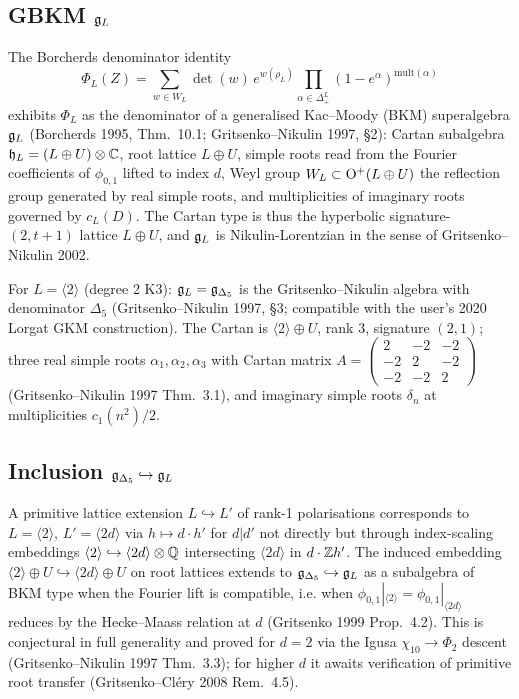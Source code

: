 \subsection*{GBKM $\mathfrak{g}_L$}

The Borcherds denominator identity
\[
 \Phi_L(Z) = \sum_{w \in W_L} \det(w)\, e^{w(\rho_L)} \prod_{\alpha \in \Delta_+^L} (1 - e^{\alpha})^{\mathrm{mult}(\alpha)}
\]
exhibits $\Phi_L$ as the denominator of a generalised Kac--Moody (BKM)
superalgebra $\mathfrak{g}_L$ (Borcherds 1995, Thm.~10.1; Gritsenko--Nikulin 1997,
\S2): Cartan subalgebra $\mathfrak{h}_L = (L \oplus U) \otimes \mathbb{C}$, root lattice
$L \oplus U$, simple roots read from the Fourier coefficients of
$\phi_{0,1}$ lifted to index $d$, Weyl group $W_L \subset \mathrm{O}^+(L \oplus U)$ the
reflection group generated by real simple roots, and multiplicities of
imaginary roots governed by $c_L(D)$. The Cartan type is thus the hyperbolic
signature-$(2, t+1)$ lattice $L \oplus U$, and $\mathfrak{g}_L$ is Nikulin-Lorentzian
in the sense of Gritsenko--Nikulin 2002.

For $L = \langle 2 \rangle$ (degree 2 K3): $\mathfrak{g}_L = \mathfrak{g}_{\Delta_5}$ is
the Gritsenko--Nikulin algebra with denominator $\Delta_5$ (Gritsenko--Nikulin
1997, \S3; compatible with the user's 2020 Lorgat GKM construction).
The Cartan is $\langle 2 \rangle \oplus U$, rank $3$, signature $(2, 1)$;
three real simple roots $\alpha_1, \alpha_2, \alpha_3$ with Cartan matrix
$A = \begin{pmatrix} 2 & -2 & -2 \\ -2 & 2 & -2 \\ -2 & -2 & 2 \end{pmatrix}$
(Gritsenko--Nikulin 1997 Thm.~3.1), and imaginary simple roots $\delta_n$
at multiplicities $c_1(n^2) / 2$.

\subsection*{Inclusion $\mathfrak{g}_{\Delta_5} \hookrightarrow \mathfrak{g}_L$}

A primitive lattice extension $L \hookrightarrow L'$ of rank-1 polarisations
corresponds to $L = \langle 2 \rangle$, $L' = \langle 2d \rangle$ via
$h \mapsto d \cdot h'$ for $d | d'$ not directly but through index-scaling
embeddings $\langle 2 \rangle \hookrightarrow \langle 2d \rangle \otimes \mathbb{Q}$
intersecting $\langle 2d \rangle$ in $d \cdot \mathbb{Z} h'$. The induced embedding
$\langle 2 \rangle \oplus U \hookrightarrow \langle 2d \rangle \oplus U$ on
root lattices extends to $\mathfrak{g}_{\Delta_5} \hookrightarrow \mathfrak{g}_L$ as a
subalgebra of BKM type when the Fourier lift is compatible, i.e. when
$\phi_{0,1}|_{\langle 2 \rangle} = \phi_{0,1}|_{\langle 2d \rangle}$ reduces
by the Hecke--Maass relation at $d$
(Gritsenko 1999 Prop.~4.2). This is conjectural in full generality and
proved for $d = 2$ via the Igusa $\chi_{10} \to \Phi_2$ descent
(Gritsenko--Nikulin 1997 Thm.~3.3); for higher $d$ it awaits verification of
primitive root transfer (Gritsenko--Cl\'ery 2008 Rem.~4.5).

